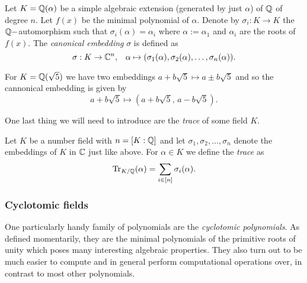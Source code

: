 \begin{definition}
	Let $K = \mathbb{Q}(\alpha)$ be a simple algebraic extension (generated by just $\alpha$) of $\mathbb{Q}$ of degree $n$. Let $f(x)$ be the minimal polynomial of $\alpha$. Denote by $\sigma_i : K \rightarrow K$ the $\mathbb{Q}-$automorphism such that $\sigma_i(\alpha) = \alpha_i$ where $\alpha := \alpha_1$ and $\alpha_i$ are the roots of $f(x)$. The \textit{canonical embedding} $\sigma$ is defined as
	\[ \sigma : K \rightarrow \mathbb{C}^n, \; \; \; \alpha \mapsto  (\sigma_1(\alpha), \sigma_2(\alpha), \ldots, \sigma_n(\alpha)). \]
\end{definition}

\begin{example}
    For $K = \mathbb{Q}(\sqrt{5})$ we have two embeddings $a+b\sqrt{5} \mapsto a \pm b\sqrt{5}$ and so the cannonical embedding is given by
	\[ a + b\sqrt{5} \mapsto (a + b\sqrt{5},\, a - b\sqrt{5}). \]
\end{example}

One last thing we will need to introduce are the \textit{trace} of some field $K$.

\begin{definition}
	Let $K$ be a number field with $n = [K:\mathbb{Q}]$ and let $\sigma_1, \sigma_2, \ldots, \sigma_n$ denote the embeddings of $K$ in $\mathbb{C}$ just like above. For $\alpha \in K$ we define the \textit{trace} as
	\[ \Tr_{K/\mathbb{Q}}(\alpha) = \sum_{i \in [n]} \sigma_i(\alpha). \]
\end{definition}


\subsubsection*{Cyclotomic fields}
One particularly handy family of polynomials are the \textit{cyclotomic polynomials}. As defined momentarily, they are the minimal polynomials of the primitive roots of unity which poses many interesting algebraic properties. They also turn out to be much easier to compute and in general perform computational operations over, in contrast to most other polynomials.

